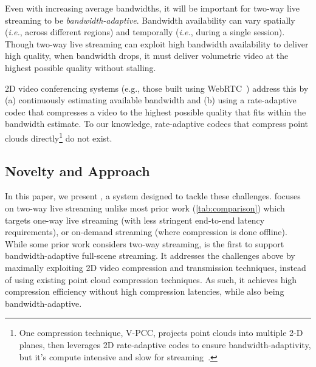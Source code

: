 %
Even with increasing average bandwidths, it will be important for two-way live streaming to be \textit{bandwidth-adaptive}.
%
Bandwidth availability can vary spatially (\textit{i.e.}, across different regions) and temporally (\textit{i.e.}, during a single session).
%
Though two-way live streaming can exploit high bandwidth availability to deliver high quality, when bandwidth drops, it must deliver volumetric video at the highest possible quality without stalling.

2D video conferencing systems (e.g., those built using WebRTC~\cite{webrtc}) address this by (a) continuously estimating available bandwidth and (b) using a rate-adaptive codec that compresses a video to the highest possible quality that fits within the bandwidth estimate.
%
To our knowledge, rate-adaptive codecs that compress point clouds directly\footnote{One compression technique, V-PCC, projects point clouds into multiple 2-D planes, then leverages 2D rate-adaptive codes to ensure bandwidth-adaptivity, but it's compute intensive and slow for streaming~\cite{groot}.}
do not exist.


\subsection{\sysname{} Novelty and Approach}
\label{s:approach-1}
In this paper, we present \sysname, a system designed to tackle these challenges. 
%
\sysname focuses on two-way live streaming 
unlike most prior work (\cref{tab:comparison})
which targets one-way live streaming (with less stringent end-to-end latency requirements), or on-demand streaming (where compression is done offline). 
%
While some prior work considers two-way streaming, \sysname is the first to support bandwidth-adaptive full-scene streaming. 
%
%
%
%
It addresses the challenges above by maximally exploiting 2D video compression and transmission techniques, instead of using existing point cloud compression techniques.
%
As such, it achieves high compression efficiency without high compression latencies, while also being bandwidth-adaptive.
%

